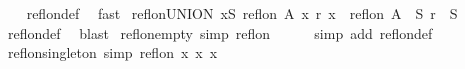 \begin{isabellebody}
%
\isadelimproof
\ \ %
\endisadelimproof
%
\isatagproof
{}\isamarkupfalse%
\ refl{\isacharunderscore}{\kern0pt}on{\isacharunderscore}{\kern0pt}def\ \isamarkupfalse%
\ fast%
\endisatagproof
{\isafoldproof}%
%
\isadelimproof
\isanewline
%
\endisadelimproof
\isanewline
{}\isamarkupfalse%
\ refl{\isacharunderscore}{\kern0pt}on{\isacharunderscore}{\kern0pt}UNION{\isacharcolon}{\kern0pt}\ {\isachardoublequoteopen}{\isasymforall}x{\isasymin}S{\isachardot}{\kern0pt}\ refl{\isacharunderscore}{\kern0pt}on\ {\isacharparenleft}{\kern0pt}A\ x{\isacharparenright}{\kern0pt}\ {\isacharparenleft}{\kern0pt}r\ x{\isacharparenright}{\kern0pt}\ {\isasymLongrightarrow}\ refl{\isacharunderscore}{\kern0pt}on\ {\isacharparenleft}{\kern0pt}{\isasymUnion}{\isacharparenleft}{\kern0pt}A\ {\isacharbackquote}{\kern0pt}\ S{\isacharparenright}{\kern0pt}{\isacharparenright}{\kern0pt}\ {\isacharparenleft}{\kern0pt}{\isasymUnion}{\isacharparenleft}{\kern0pt}r\ {\isacharbackquote}{\kern0pt}\ S{\isacharparenright}{\kern0pt}{\isacharparenright}{\kern0pt}{\isachardoublequoteclose}\isanewline
%
\isadelimproof
\ \ %
\endisadelimproof
%
\isatagproof
{}\isamarkupfalse%
\ refl{\isacharunderscore}{\kern0pt}on{\isacharunderscore}{\kern0pt}def\ \isamarkupfalse%
\ blast%
\endisatagproof
{\isafoldproof}%
%
\isadelimproof
\isanewline
%
\endisadelimproof
\isanewline
{}\isamarkupfalse%
\ refl{\isacharunderscore}{\kern0pt}on{\isacharunderscore}{\kern0pt}empty\ {\isacharbrackleft}{\kern0pt}simp{\isacharbrackright}{\kern0pt}{\isacharcolon}{\kern0pt}\ {\isachardoublequoteopen}refl{\isacharunderscore}{\kern0pt}on\ {\isacharbraceleft}{\kern0pt}{\isacharbraceright}{\kern0pt}\ {\isacharbraceleft}{\kern0pt}{\isacharbraceright}{\kern0pt}{\isachardoublequoteclose}\isanewline
%
\isadelimproof
\ \ %
\endisadelimproof
%
\isatagproof
{}\isamarkupfalse%
\ {\isacharparenleft}{\kern0pt}simp\ add{\isacharcolon}{\kern0pt}\ refl{\isacharunderscore}{\kern0pt}on{\isacharunderscore}{\kern0pt}def{\isacharparenright}{\kern0pt}%
\endisatagproof
{\isafoldproof}%
%
\isadelimproof
\isanewline
%
\endisadelimproof
\isanewline
{}\isamarkupfalse%
\ refl{\isacharunderscore}{\kern0pt}on{\isacharunderscore}{\kern0pt}singleton\ {\isacharbrackleft}{\kern0pt}simp{\isacharbrackright}{\kern0pt}{\isacharcolon}{\kern0pt}\ {\isachardoublequoteopen}refl{\isacharunderscore}{\kern0pt}on\ {\isacharbraceleft}{\kern0pt}x{\isacharbraceright}{\kern0pt}\ {\isacharbraceleft}{\kern0pt}{\isacharparenleft}{\kern0pt}x{\isacharcomma}{\kern0pt}\ x{\isacharparenright}{\kern0pt}{\isacharbraceright}{\kern0pt}{\isachardoublequoteclose}\isanewline

\end{isabellebody}
